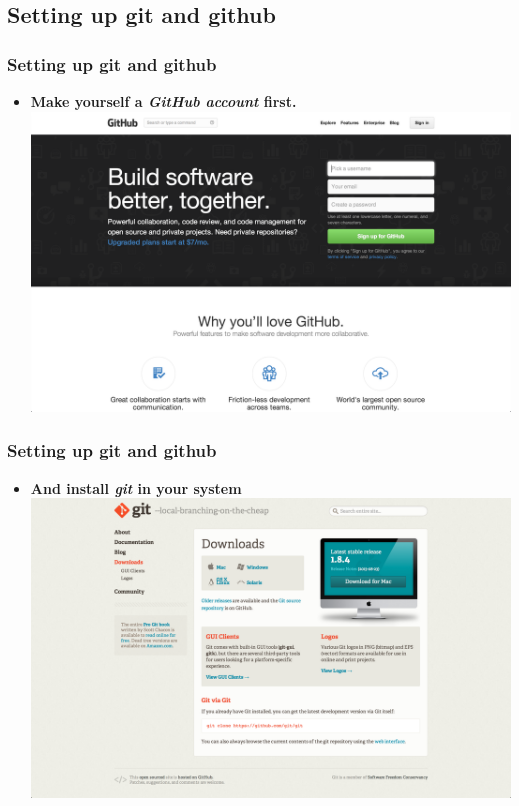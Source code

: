 \documentclass{beamer}
\begin{document}
\subsection{Setting up git and github}
\begin{frame}
\frametitle{Setting up git and github}
\begin{itemize}
\item \textbf{Make yourself a \textit{GitHub account} first.}
\vspace{1cm}
  \includegraphics[scale=0.2]{set.png}
\end{itemize}
\end{frame}

\begin{frame}
\frametitle{Setting up git and github}
\begin{itemize}
\item \textbf{And install \textit{git} in your system}
\vspace{1cm}
  \includegraphics[scale=0.2]{setup.png}
\end{itemize}
\end{frame}
  
\end{document}
